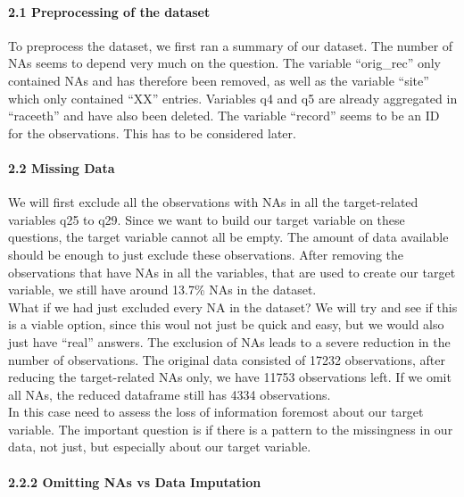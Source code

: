 \documentclass[
]{article}
\begin{document}
\hypertarget{preprocessing-of-the-dataset}{%
\paragraph{2.1 Preprocessing of the
dataset}\label{preprocessing-of-the-dataset}}

\hfill\break

To preprocess the dataset, we first ran a summary of our dataset. The
number of NAs seems to depend very much on the question. The variable
``orig\_rec'' only contained NAs and has therefore been removed, as well
as the variable ``site'' which only contained ``XX'' entries. Variables
q4 and q5 are already aggregated in ``raceeth'' and have also been
deleted. The variable ``record'' seems to be an ID for the observations.
This has to be considered later.

\hypertarget{missing-data}{%
\paragraph{2.2 Missing Data}\label{missing-data}}

\hfill\break
We will first exclude all the observations with NAs in all the
target-related variables q25 to q29. Since we want to build our target
variable on these questions, the target variable cannot all be empty.
The amount of data available should be enough to just exclude these
observations. After removing the observations that have NAs in all the
variables, that are used to create our target variable, we still have
around 13.7\% NAs in the dataset.\\
What if we had just excluded every NA in the dataset? We will try and
see if this is a viable option, since this woul not just be quick and
easy, but we would also just have ``real'' answers. The exclusion of NAs
leads to a severe reduction in the number of observations. The original
data consisted of 17232 observations, after reducing the target-related
NAs only, we have 11753 observations left. If we omit all NAs, the
reduced dataframe still has 4334 observations.\\

In this case need to assess the loss of information foremost about our
target variable. The important question is if there is a pattern to the
missingness in our data, not just, but especially about our target
variable.

\hypertarget{omitting-nas-vs-data-imputation}{%
\paragraph{2.2.2 Omitting NAs vs Data
Imputation}\label{omitting-nas-vs-data-imputation}}
\end{document}
